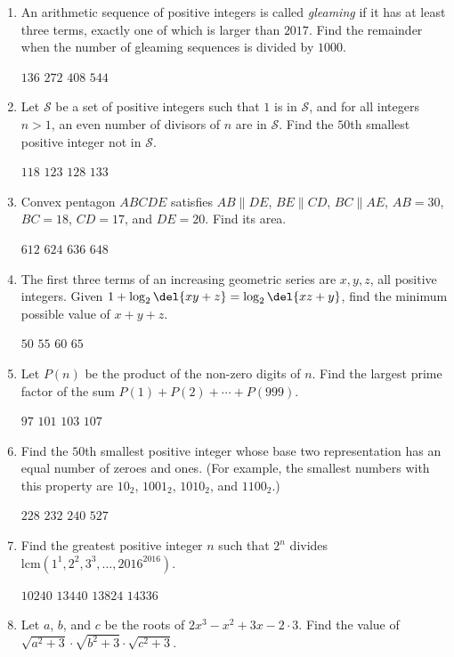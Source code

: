 \documentclass[11pt,paper=letter]{scrartcl}
\begin{document}
\begin{enumerate}
  \item An arithmetic sequence of positive integers is called \emph{gleaming} if it has at least three terms, exactly one of which is larger than $2017$. Find the remainder when the number of gleaming sequences is divided by $1000$.

  \fourch
  {$136$}
  {$272$}
  {$408$}
  {$544$}

  \item Let $\mathcal S$ be a set of positive integers such that $1$ is in $\mathcal S$, and for all integers $n > 1$, an even number of divisors of $n$ are in $\mathcal S$. Find the $50$th smallest positive integer not in $\mathcal S$.

  \fourch
  {$118$}
  {$123$}
  {$128$}
  {$133$}

  \item Convex pentagon $ABCDE$ satisfies $AB \parallel DE$, $BE \parallel CD$, $BC \parallel AE$, $AB = 30$, $BC = 18$, $CD = 17$, and $DE = 20$. Find its area.

  \fourch
  {$612$}
  {$624$}
  {$636$}
  {$648$}

  \item The first three terms of an increasing geometric series are $x, y, z$, all positive integers. Given $1 + \log_2\del{xy+z} = \log_2\del{xz+y}$, find the minimum possible value of $x+y+z$.

  \fourch
  {$50$}
  {$55$}
  {$60$}
  {$65$}

  \item Let $P(n)$ be the product of the non-zero digits of $n$. Find the largest prime factor of the sum $P(1) + P(2) + \cdots + P(999)$.

  \fourch
  {$97$}
  {$101$}
  {$103$}
  {$107$}

  \item Find the $50$th smallest positive integer whose base two representation has an equal number of zeroes and ones. (For example, the smallest numbers with this property are $10_2$, $1001_2$, $1010_2$, and $1100_2$.)

  \fourch
  {$228$}
  {$232$}
  {$240$}
  {$527$}

  \item Find the greatest positive integer $n$ such that $2^n$ divides $\text{lcm}\left(1^1,2^2,3^3,\ldots,2016^{2016}\right).$

  \fourch
  {$10240$}
  {$13440$}
  {$13824$}
  {$14336$}

  \item Let $a$, $b$, and $c$ be the roots of $2x^3-x^2+3x-2 \cdot 3$. Find the value of $\sqrt{a^2+3} \cdot \sqrt{b^2+3} \cdot \sqrt{c^2+3}$.


\end{enumerate}
\end{document}
